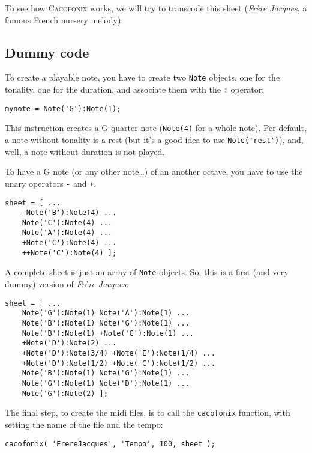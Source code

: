 \documentclass{article}
\newcommand\cacofonix{\textsc{Cacofonix}\xspace}
\newcommand\note{\lstinline!Note!\xspace}
\newcommand\frerejaques{\emph{Fr\`ere Jacques}\xspace}
\begin{document}
To see how \cacofonix works, we will try to transcode this sheet (\frerejaques, a famous French nursery melody):\\

\subsection{Dummy code}

To create a playable note, you have to create two \note objects, one for the tonality, one for the duration, and associate them with the \lstinline!:! operator:
\begin{lstlisting}
mynote = Note('G'):Note(1);
\end{lstlisting}
This instruction creates a G quarter note (\lstinline!Note(4)! for a whole note). Per default, a note without tonality is a rest (but it's a good idea to use \lstinline!Note('rest')!), and, well, a note without duration is not played.

To have a G note (or any other note\dots) of an another octave, you have to use the unary operators \lstinline!-! and \lstinline!+!. \\
\begin{lstlisting}
sheet = [ ...
	-Note('B'):Note(4) ...
	Note('C'):Note(4) ...
	Note('A'):Note(4) ...
	+Note('C'):Note(4) ...
	++Note('C'):Note(4) ];
\end{lstlisting}

A complete sheet is just an array of \lstinline!Note! objects. So, this is a first (and very dummy) version of \frerejaques:
\begin{lstlisting}
sheet = [ ...
	Note('G'):Note(1) Note('A'):Note(1) ...
	Note('B'):Note(1) Note('G'):Note(1) ...
	Note('B'):Note(1) +Note('C'):Note(1) ...
	+Note('D'):Note(2) ...
	+Note('D'):Note(3/4) +Note('E'):Note(1/4) ...
	+Note('D'):Note(1/2) +Note('C'):Note(1/2) ...
	Note('B'):Note(1) Note('G'):Note(1) ...
	Note('G'):Note(1) Note('D'):Note(1) ...
	Note('G'):Note(2) ];
\end{lstlisting}

The final step, to create the midi files, is to call the \lstinline!cacofonix! function, with setting the name of the file and the tempo:
\begin{lstlisting}
cacofonix( 'FrereJacques', 'Tempo', 100, sheet );
\end{lstlisting}
\end{document}
